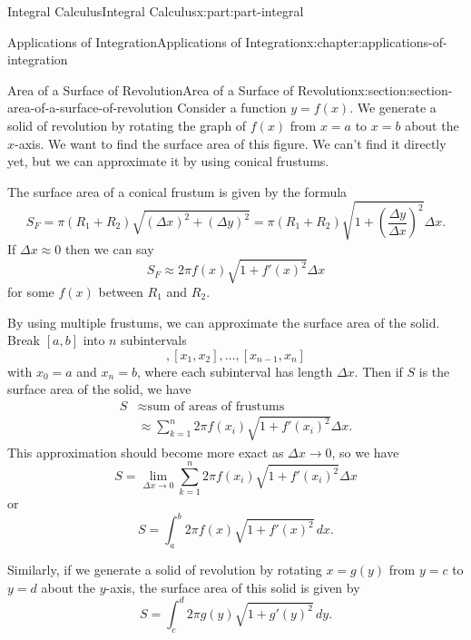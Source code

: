 \documentclass[twoside,10pt,]{tufte-book}
\numberwithin{equation}{part}
\newcommand{\amp}{&}
\begin{document}
\begin{partptx}{Integral Calculus}{}{Integral Calculus}{}{}{x:part:part-integral}
\begin{chapterptx}{Applications of Integration}{}{Applications of Integration}{}{}{x:chapter:applications-of-integration}
\typeout{************************************************}
%
\begin{sectionptx}{Area of a Surface of Revolution}{}{Area of a Surface of Revolution}{}{}{x:section:section-area-of-a-surface-of-revolution}
Consider a function \(y=f(x)\). We generate a solid of revolution by rotating the graph of \(f(x)\) from \(x=a\) to \(x=b\) about the \(x\)-axis. We want to find the surface area of this figure. We can't find it directly yet, but we can approximate it by using conical frustums.%
\par
The surface area of a conical frustum is given by the formula%
\begin{equation*}
S_{F}=\pi(R_{1}+R_{2})\sqrt{(\Delta x)^{2}+(\Delta y)^{2}}=\pi(R_{1}+R_{2})\sqrt{1+\left(\frac{\Delta y}{\Delta x}\right)^{2}}\Delta x.
\end{equation*}
If \(\Delta x\approx0\) then we can say%
\begin{equation*}
S_{F}\approx2\pi f(x)\sqrt{1+f'(x)^{2}}\Delta x
\end{equation*}
for some \(f(x)\) between \(R_{1}\) and \(R_{2}\).%
\par
By using multiple frustums, we can approximate the surface area of the solid. Break \([a,b]\) into \(n\) subintervals%
\begin{equation*}
[x_{0},x_{1}],[x_{1},x_{2}],\ldots,[x_{n-1},x_{n}]
\end{equation*}
with \(x_{0}=a\) and \(x_{n}=b\), where each subinterval has length \(\Delta x\). Then if \(S\) is the surface area of the solid, we have%
\begin{align*}
S\amp\approx\text{sum of areas of frustums}\\
\amp\approx\sum_{k=1}^{n}2\pi f(x_{i})\sqrt{1+f'(x_{i})^{2}}\Delta x.
\end{align*}
This approximation should become more exact as \(\Delta x \to 0\), so we have%
\begin{equation*}
S=\lim_{\Delta x\to0}\sum_{k=1}^{n}2\pi f(x_{i})\sqrt{1+f'(x_{i})^{2}}\Delta x
\end{equation*}
or%
\begin{equation*}
S=\int_{a}^{b}2\pi f(x)\sqrt{1+f'(x)^{2}}\,dx.
\end{equation*}
%
\par
Similarly, if we generate a solid of revolution by rotating \(x=g(y)\) from \(y=c\) to \(y=d\) about the \(y\)-axis, the surface area of this solid is given by%
\begin{equation*}
S=\int_{c}^{d}2\pi g(y)\sqrt{1+g'(y)^{2}}\,dy.

\end{equation*}
\end{sectionptx}
\end{chapterptx}
\end{partptx}
\end{document}
